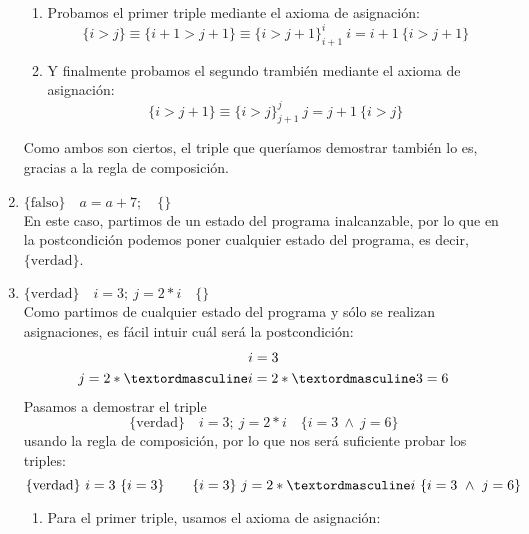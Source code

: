 \begin{ejercicio}
\begin{enumerate}
                \begin{enumerate}
                    \item Probamos el primer triple mediante el axioma de asignación:
                        \begin{equation*}
                            \{i>j\} \equiv \{i+1>j+1\} \equiv \{i>j+1\}^i_{i+1}\ i=i+1\ \{i>j+1\}
                        \end{equation*}
                    \item Y finalmente probamos el segundo trambién mediante el axioma de asignación:
                        \begin{equation*}
                            \{i>j+1\} \equiv \{i>j\}^j_{j+1}\ j=j+1\ \{i>j\}
                        \end{equation*}
                \end{enumerate}
                Como ambos son ciertos, el triple que queríamos demostrar también lo es, gracias a la regla de composición.
        \item $\{\text{falso}\} \quad a = a + 7; \quad \{ \}$\\
            En este caso, partimos de un estado del programa inalcanzable, por lo que en la postcondición podemos poner cualquier estado del programa, es decir, $\{\text{verdad}\}$.
        \item $\{\text{verdad}\} \quad i = 3;~j = 2 \ast i \quad \{ \}$\\
            Como partimos de cualquier estado del programa y sólo se realizan asignaciones, es fácil intuir cuál será la postcondición:
            \begin{gather*}
                i = 3 \\
                j = 2\astº i = 2\astº 3 = 6
            \end{gather*}
            Pasamos a demostrar el triple
            \begin{equation*}
                \{\text{verdad}\} \quad i = 3;~j = 2 \ast i \quad \{i=3\ \land\ j=6\}
            \end{equation*}
            usando la regla de composición, por lo que nos será suficiente probar los triples:
            \begin{equation*}
                \{\text{verdad}\}\ i=3\ \{i=3\} \qquad \{i=3\}\ j=2\astº i\ \{i=3\ \land\ j=6\}
            \end{equation*}
            \begin{enumerate}
                \item Para el primer triple, usamos el axioma de asignación:

\end{enumerate}
\end{enumerate}
\end{ejercicio}
